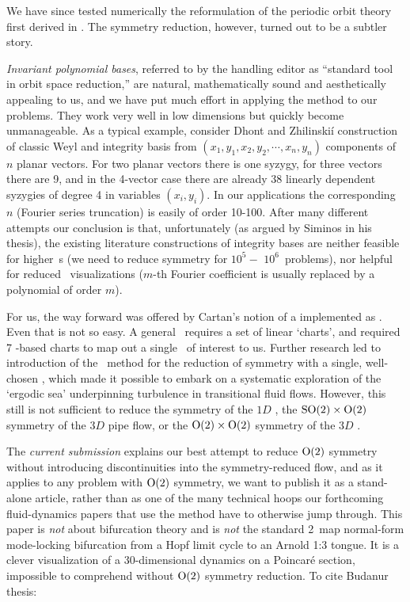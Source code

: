 \documentclass[12pt]{article}
\begin{document}
We have since tested numerically the reformulation of the
periodic orbit theory first derived in . The symmetry
reduction, however, turned out to be a subtler story.

\emph{Invariant polynomial bases}, referred to by
the handling editor as ``standard tool in orbit space reduction,'' are
natural, mathematically sound and
aesthetically appealing to us, and we have put much effort in applying
the method to our problems. They work very well in low
dimensions but quickly become unmanageable. As a
typical example, consider Dhont and Zhilinski\'i
construction of classic  Weyl  and  integrity
basis from $(x_1,y_1,x_2,y_2,\cdots,x_n,y_n)$ components of $n$ planar
vectors. For two planar vectors there is one syzygy, for three vectors
there are 9, and in the 4-vector case there are already 38 linearly
dependent syzygies of degree 4 in variables $(x_i, y_i)$. In our
applications the corresponding $n$ (Fourier series truncation)
is easily of order 10-100. After many different attempts
our conclusion is that, unfortunately (as argued by Siminos in his
thesis), the existing literature constructions of
integrity bases are neither feasible for higher\dmn\ \statesp s (we need
to reduce symmetry for $10^5-$ $10^6$\dmn\ problems),
nor helpful for reduced \statesp\ visualizations ($m$-th Fourier
coefficient is usually replaced by a polynomial of order $m$).

For us, the way forward was offered by Cartan's notion of a
{\em \movframe} implemented as
\mslices{}. Even that
is not so easy. A general \slice\ requires a set of linear
`charts', and  required 7 \reqv-based charts
to map out a single \rpo\ of interest to us. Further research led to
introduction of the \fFslice\ method for the reduction of 
symmetry with a single, well-chosen \slice, which made it
possible to embark on a systematic exploration of the `ergodic sea'
underpinning turbulence in transitional fluid flows.
However, this still is not sufficient to reduce the  symmetry of
the $1D$ \KS, the $\textrm{SO}(2)\times \textrm{O}(2)$ symmetry of the $3D$ pipe flow,
or the $\textrm{O}(2)\times \textrm{O}(2)$ symmetry of the $3D$ \pCf.

The \emph{current submission} explains our best attempt to reduce
$\textrm{O}(2)$ symmetry without introducing discontinuities into the
symmetry-reduced flow, and as it applies to any problem with $\textrm{O}(2)$
symmetry, we want to publish it as a stand-alone article, rather than as
one of the many technical hoops our forthcoming fluid-dynamics papers
that use the method have to otherwise jump through. This paper is
\emph{not} about bifurcation theory and  is
\emph{not} the standard 2\dmn\ map normal-form mode-locking bifurcation
from a Hopf limit cycle to an Arnold 1:3 tongue. It is a clever
visualization of a 30-dimensional dynamics on a Poincar\'e section,
impossible to comprehend without $\textrm{O}(2)$ symmetry reduction. To cite
Budanur thesis:
\end{document}
